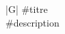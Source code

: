 

\begin{tabular}{|G|}
	\hline
     \textcolor{compCAp!20!white}{#titre} \\
	\hline
	#description \\
\hline
\end{tabular}
